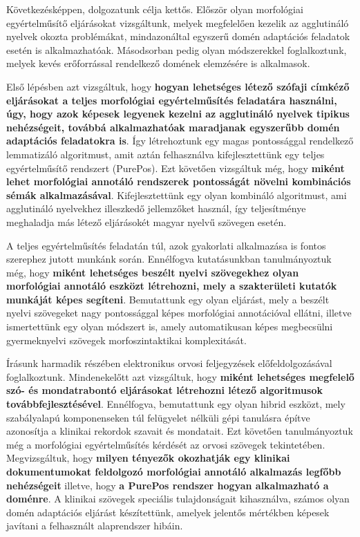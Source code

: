 Következésképpen, dolgozatunk célja kettős.
Először olyan morfológiai egyértelműsítő eljárásokat vizsgáltunk, melyek megfelelően kezelik az agglutináló nyelvek okozta problémákat, mindazonáltal egyszerű domén adaptációs feladatok esetén is alkalmazhatóak.
Másodsorban pedig olyan módszerekkel foglalkoztunk, melyek kevés erőforrással rendelkező domének elemzésére is alkalmasok.

Első lépésben azt vizsgáltuk, hogy \textbf{hogyan lehetséges létező szófaji címkéző eljárásokat a teljes morfológiai egyértelműsítés feladatára használni, úgy, hogy azok képesek legyenek kezelni az agglutináló nyelvek tipikus nehézségeit, továbbá alkalmazhatóak maradjanak egyszerűbb domén adaptációs feladatokra is}.
Így létrehoztunk egy magas pontossággal rendelkező lemmatizáló algoritmust, amit aztán felhasználva kifejlesztettünk egy teljes egyértelműsítő rendszert (PurePos).
Ezt követően vizsgáltuk még, hogy \textbf{miként lehet morfológiai annotáló rendszerek pontosságát növelni kombinációs sémák alkalmazásával}.
Kifejlesztettünk egy olyan kombináló algoritmust, ami agglutináló nyelvekhez illeszkedő jellemzőket használ, így teljesítménye meghaladja más létező eljárásokét magyar nyelvű szövegen esetén.

A teljes egyértelműsítés feladatán túl, azok gyakorlati alkalmazása is fontos szerephez jutott munkánk során.
Ennélfogva kutatásunkban tanulmányoztuk még, hogy \textbf{miként lehetséges beszélt nyelvi szövegekhez olyan morfológiai annotáló eszközt létrehozni, mely a szakterületi kutatók munkáját képes segíteni}.
Bemutattunk egy olyan eljárást, mely a beszélt nyelvi szövegeket nagy pontossággal képes morfológiai annotációval ellátni, illetve ismertettünk egy olyan módszert is, amely automatikusan képes megbecsülni gyermeknyelvi szövegek morfoszintaktikai komplexitását.

Írásunk harmadik részében elektronikus orvosi feljegyzések előfeldolgozásával foglalkoztunk.
Mindenekelőtt azt vizsgáltuk, hogy \textbf{miként lehetséges megfelelő szó- és mondatrabontó eljárásokat létrehozni létező algoritmusok továbbfejlesztésével}.
Ennélfogva, bemutattunk egy olyan hibrid eszközt, mely szabályalapú komponenseken túl felügyelet nélküli gépi tanulásra építve azonosítja a klinikai rekordok szavait és mondatait. 
Ezt követően tanulmányoztuk még a morfológiai egyértelműsítés kérdését az orvosi szövegek tekintetében.
Megvizsgáltuk, hogy \textbf{milyen tényezők okozhatják egy klinikai dokumentumokat feldolgozó morfológiai annotáló alkalmazás legfőbb nehézségeit} illetve, hogy \textbf{a PurePos rendszer hogyan alkalmazható a doménre}.
A klinikai szövegek speciális tulajdonságait kihasználva, számos olyan domén adaptációs eljárást készítettünk, amelyek jelentős mértékben képesek javítani a felhasznált alaprendszer hibáin.



